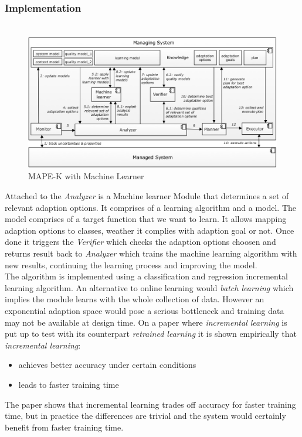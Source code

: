 \documentclass[pdftex,english,oribibl]{llncs}
\begin{document}
\subsubsection{Implementation \\\\}
\begin{figure}[H]
\centering
	\includegraphics[totalheight=6cm]{figures/mLearner}
    \caption{MAPE-K with Machine Learner \cite{efficientAnalysisAdaptionSpaces}}
    \label{fig:mlearner}
\end{figure}
Attached to the \textit{Analyzer} is a Machine learner Module that determines a set of relevant adaption options.
It comprises of a learning algorithm and a model. The model comprises of a target function that we want to learn.
It allows mapping adaption options to classes, weather it complies with adaption goal or not. Once done it triggers
the \textit{Verifier} which checks the adaption options choosen and returns result back to \textit{Analyzer} which trains
the machine learning algorithm with new results, continuing the learning process and improving the model. 
\\
The algorithm is implemented using a classification and regression incremental learning algorithm. 
An alternative to online learning would \textit{batch learning} which implies the module learns with the whole collection of data. However an exponential adaption space would pose a serious bottleneck and training data may not be available at design time. On a paper \citep{allVSOne} where \textit{incremental learning} is put up to test with its counterpart \textit{retrained learning} it is shown empirically that \textit{incremental learning}:
\begin{itemize}
\item achieves better accuracy under certain conditions
\item leads to faster training time
\end{itemize}
The paper \cite{allVSOne} shows that incremental learning trades off accuracy for faster training time, but in practice the differences are trivial and the system would certainly benefit from faster training time. 
\end{document}
